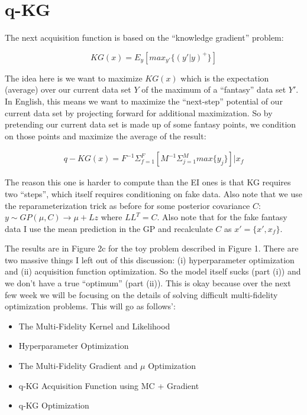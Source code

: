 \documentclass[12pt]{article}
\begin{document}
\section{q-KG}

The next acquisition function is based on the ``knowledge gradient'' problem:

\begin{equation}
KG(x)=E_y[max_{y'}\{(y' | y)^+\}]
\end{equation}

\vspace{5mm}

The idea here is we want to maximize $KG(x)$ which is the expectation (average) over our current data set $Y$ of the maximum of a ``fantasy'' data set $Y'$. In English, this means we want to maximize the ``next-step'' potential of our current data set by projecting forward for additional maximization. So by pretending our current data set is made up of some fantasy points, we condition on those points and maximize the average of the result:

\begin{align*}
q-KG(x)=F^{-1} \Sigma_{f=1}^F [M^{-1}\Sigma_{j=1}^M max\{y_j\}] | x_f
\end{align*}

\vspace{5mm}

The reason this one is harder to compute than the EI ones is that KG requires two ``steps'', which itself requires conditioning on fake data. Also note that we use the reparameterization trick as before for some posterior covariance $C$: $y \sim GP(\mu,C) \rightarrow \mu + Lz$ where $LL^T=C$. Also note that for the fake fantasy data I use the mean prediction in the GP and recalculate $C$ as $x'=\{x',x_f\}$.

\vspace{5mm}

The results are in Figure 2c for the toy problem described in Figure 1. There are two massive things I left out of this discussion: (i) hyperparameter optimization and (ii) acquisition function optimization. So the model itself sucks (part (i)) and we don't have a true ``optimum'' (part (ii)). This is okay because over the next few week we will be focusing on the details of solving difficult multi-fidelity optimization problems. This will go as follows':

\begin{itemize}
  \item The Multi-Fidelity Kernel and Likelihood
  \item Hyperparameter Optimization
  \item The Multi-Fidelity Gradient and $\mu$ Optimization
  \item q-KG Acquisition Function using MC + Gradient
  \item q-KG Optimization
\end{itemize}
\end{document}
